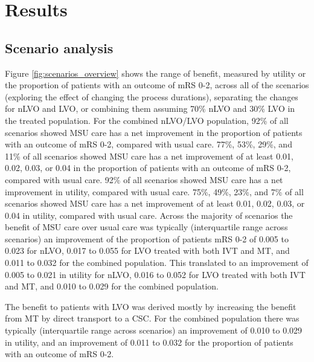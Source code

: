 \section{Results}

\subsection{Scenario analysis}

Figure \ref{fig:scenarios_overview} shows the range of benefit, measured by utility or the proportion of patients with an outcome of mRS 0-2, across all of the scenarios (exploring the effect of changing the process durations), separating the changes for nLVO and LVO, or combining them assuming 70\% nLVO and 30\% LVO in the treated population. For the combined nLVO/LVO population, 92\% of all scenarios showed MSU care has a net improvement in the proportion of patients with an outcome of mRS 0-2, compared with usual care. 77\%, 53\%, 29\%, and 11\% of all scenarios showed MSU care has a net improvement of at least 0.01, 0.02, 0.03, or 0.04 in the proportion of patients with an outcome of mRS 0-2, compared with usual care. 92\% of all scenarios showed MSU care has a net improvement in utility, compared with usual care. 75\%, 49\%, 23\%, and 7\% of all scenarios showed MSU care has a net improvement of at least 0.01, 0.02, 0.03, or 0.04 in utility, compared with usual care. Across the majority of scenarios the benefit of MSU care over usual care was typically (interquartile range across scenarios) an improvement of the proportion of patients mRS 0-2 of 0.005 to 0.023 for nLVO, 0.017 to 0.055 for LVO treated with both IVT and MT, and 0.011 to 0.032 for the combined population. This translated to an improvement of 0.005 to 0.021 in utility for nLVO, 0.016 to 0.052 for LVO treated with both IVT and MT, and 0.010 to 0.029 for the combined population. 

The benefit to patients with LVO was derived mostly by increasing the benefit from MT by direct transport to a CSC. For the combined population there was typically (interquartile range across scenarios) an improvement of 0.010 to 0.029 in utility, and an improvement of 0.011 to 0.032 for the proportion of patients with an outcome of mRS 0-2.


